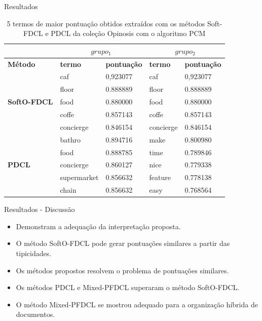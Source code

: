 \documentclass[brazil]{beamer}
\begin{document}
\begin{frame}{Resultados}
  \begin{table}[!htp]
    \centering
    \begin{tabular}{ |l| l l | l l|}
      \hline
      & \multicolumn{2}{c|}{$grupo_1$} & \multicolumn{2}{c|}{$grupo_2$} \\
      \hline
      {\bf Método} & {\bf termo} & {\bf pontuação} & {\bf termo} & {\bf pontuação} \\
      \hline
      \multirow{5}{*}{{\bf SoftO-FDCL}} & caf       & \alert{0,923077}  & caf       &
      \alert{0,923077} \\
                                        & floor	    & \alert{0.888889}  & floor	    &
      \alert{0.888889} \\
                                        & food	    & \alert{0.880000}  & food	    &
      \alert{0.880000} \\
                                        & coffe	    & \alert{0.857143}  & coffe	    &
      \alert{0.857143} \\
                                        & concierge & \alert{0.846154}  & concierge &
      \alert{0.846154} \\
      \hline
      \multirow{5}{*}{{\bf PDCL}} & bathro      &  0.894716  & make    & 0.800980 \\       
                                  & food        &  0.888785  & time    & 0.789846 \\       
                                  & concierge    &  0.860127  & nice    & 0.779338 \\       
                                  & supermarket &  0.856632  & feature & 0.778138 \\       
                                  & chain       &  0.856632  & easy    & 0.768564 \\       
      \hline
    \end{tabular}
    \caption{5 termos de maior pontuação obtidos extraídos com os métodos Soft-FDCL e PDCL da coleção Opinosis com o algoritmo PCM}
  \end{table}
\end{frame}

\begin{frame}{Resultados - Discussão}
  \begin{itemize}
    \item Demonstram a adequação da interpretação proposta.
    \item O método SoftO-FDCL pode gerar pontuações similares a partir das tipicidades.
    \item Os métodos propostos resolvem o problema de pontuações similares.
    \item Os métodos PDCL e Mixed-PFDCL superaram o método SoftO-FDCL.
    \item O método Mixed-PFDCL se mostrou adequado para a organização híbrida de documentos.
  \end{itemize}
\end{frame}
\end{document}
